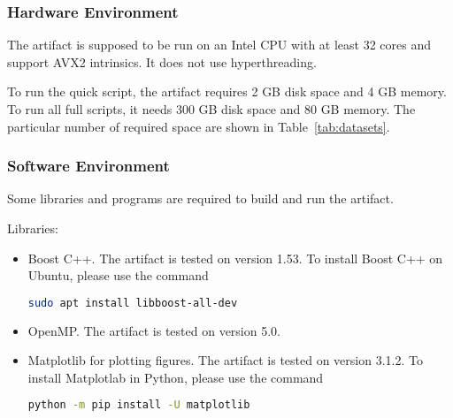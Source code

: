 %
%
%
%
%

\subsubsection{Hardware Environment}
The artifact is supposed to be run on an Intel CPU with at least 32 cores and support AVX2 intrinsics. It does not use hyperthreading.

To run the quick script, the artifact requires 2 GB disk space and 4 GB memory. To run all full scripts, it needs 300 GB disk space and 80 GB memory. The particular number of required space are shown in Table~\ref{tab:datasets}.

\subsubsection{Software Environment}
Some libraries and programs are required to build and run the artifact.

Libraries:
\begin{itemize}
    \item Boost C++. The artifact is tested on version 1.53. To install Boost C++ on Ubuntu, please use the command
    
\begin{lstlisting}[language=bash]
sudo apt install libboost-all-dev
\end{lstlisting}
    
    \item OpenMP. The artifact is tested on version 5.0.
    \item Matplotlib for plotting figures. The artifact is tested on version 3.1.2. To install Matplotlab in Python, please use the command
\begin{lstlisting}[language=bash]
python -m pip install -U matplotlib
\end{lstlisting}
\end{itemize}

